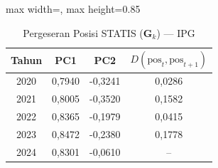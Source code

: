 \begin{table}[H]
\centering
\caption{Pergeseran Posisi STATIS ($\mathbf{G}_k$) --- IPG} \label{tab:app2jarak_statis_loading_ipg}
\begin{adjustbox}{max width=\textwidth, max height=0.85\textheight}
\begin{tabular}{|c|c|c|c|}
\hline
\textbf{Tahun} & \textbf{PC1} & \textbf{PC2} & \textbf{$D(\text{pos}_t, \text{pos}_{t+1})$} \\
\hline
2020 & 0,7940 & -0,3241 & 0,0286 \\
2021 & 0,8005 & -0,3520 & 0,1582 \\
2022 & 0,8365 & -0,1979 & 0,0415 \\
2023 & 0,8472 & -0,2380 & 0,1778 \\
2024 & 0,8301 & -0,0610 & -- \\
\hline
\end{tabular}
\end{adjustbox}
\end{table}